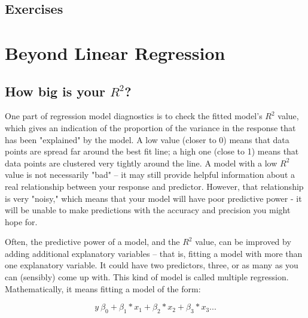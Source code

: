 \documentclass[twoside]{book}\usepackage[]{graphicx}\usepackage[]{xcolor}
\newif\ifsolutions
\newif\ifsolutionslocal
\begin{document}
\newpage
\section*{Exercises}
\shipoutProblems


\ifsolutions
\ifsolutionslocal
\newpage
\section*{Solutions}
\shipoutSolutions
\fi
\fi

 





\chapter{Beyond Linear Regression}
\section{How big is your $R^2$?}
One part of regression model diagnostics is to check the fitted model's $R^2$ value, which gives an indication of the proportion of the variance in the response that has been "explained" by the model.  A low value (closer to 0) means that data points are spread far around the best fit line; a high one (close to 1) means that data points are clustered very tightly around the line.  A model with a low $R^2$ value is not necessarily "bad" -- it may still provide helpful information about a real relationship between your response and predictor.  However, that relationship is very "noisy," which means that your model will have poor predictive power - it will be unable to make predictions with the accuracy and precision you might hope for.

Often, the predictive power of a model, and the $R^2$ value, can be improved by adding additional explanatory variables -- that is, fitting a model with more than one explanatory variable.  It could have two predictors, three, or as many as you can (sensibly) come up with. This kind of model is called multiple regression. Mathematically, it means fitting a model of the form:

$$ y ~ \beta_0 + \beta_1*x_1 + \beta_2*x_2 + \beta_3*x_3 ...$$
\end{document}
